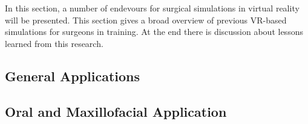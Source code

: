In this section, a number of endevours for surgical simulations in virtual reality will be presented.
This section gives a broad overview of previous VR-based simulations for surgeons in training.
At the end there is discussion about lessons learned from this research.


\subsection{\label{sec::General}General Applications}


\subsection{\label{sec::OralAndMaxillofacial}Oral and Maxillofacial Application}

